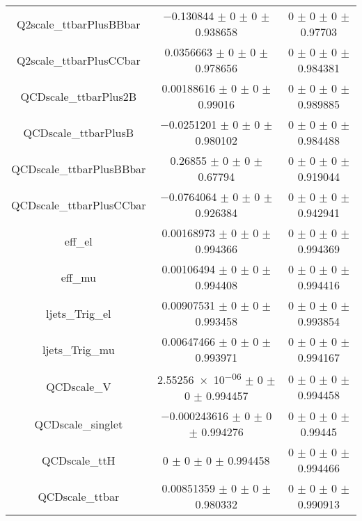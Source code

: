 \begin{table}
\begin{tabular}{ccc}
Q2scale\_ttbarPlusBBbar & \num{-0.130844} $\pm$ \num{0} $\pm$ \num{0} $\pm$ \num{0.938658} & \num{0} $\pm$ \num{0} $\pm$ \num{0} $\pm$ \num{0.97703}\\
Q2scale\_ttbarPlusCCbar & \num{0.0356663} $\pm$ \num{0} $\pm$ \num{0} $\pm$ \num{0.978656} & \num{0} $\pm$ \num{0} $\pm$ \num{0} $\pm$ \num{0.984381}\\
QCDscale\_ttbarPlus2B & \num{0.00188616} $\pm$ \num{0} $\pm$ \num{0} $\pm$ \num{0.99016} & \num{0} $\pm$ \num{0} $\pm$ \num{0} $\pm$ \num{0.989885}\\
QCDscale\_ttbarPlusB & \num{-0.0251201} $\pm$ \num{0} $\pm$ \num{0} $\pm$ \num{0.980102} & \num{0} $\pm$ \num{0} $\pm$ \num{0} $\pm$ \num{0.984488}\\
QCDscale\_ttbarPlusBBbar & \num{0.26855} $\pm$ \num{0} $\pm$ \num{0} $\pm$ \num{0.67794} & \num{0} $\pm$ \num{0} $\pm$ \num{0} $\pm$ \num{0.919044}\\
QCDscale\_ttbarPlusCCbar & \num{-0.0764064} $\pm$ \num{0} $\pm$ \num{0} $\pm$ \num{0.926384} & \num{0} $\pm$ \num{0} $\pm$ \num{0} $\pm$ \num{0.942941}\\
eff\_el & \num{0.00168973} $\pm$ \num{0} $\pm$ \num{0} $\pm$ \num{0.994366} & \num{0} $\pm$ \num{0} $\pm$ \num{0} $\pm$ \num{0.994369}\\
eff\_mu & \num{0.00106494} $\pm$ \num{0} $\pm$ \num{0} $\pm$ \num{0.994408} & \num{0} $\pm$ \num{0} $\pm$ \num{0} $\pm$ \num{0.994416}\\
ljets\_Trig\_el & \num{0.00907531} $\pm$ \num{0} $\pm$ \num{0} $\pm$ \num{0.993458} & \num{0} $\pm$ \num{0} $\pm$ \num{0} $\pm$ \num{0.993854}\\
ljets\_Trig\_mu & \num{0.00647466} $\pm$ \num{0} $\pm$ \num{0} $\pm$ \num{0.993971} & \num{0} $\pm$ \num{0} $\pm$ \num{0} $\pm$ \num{0.994167}\\
QCDscale\_V & \num{2.55256e-06} $\pm$ \num{0} $\pm$ \num{0} $\pm$ \num{0.994457} & \num{0} $\pm$ \num{0} $\pm$ \num{0} $\pm$ \num{0.994458}\\
QCDscale\_singlet & \num{-0.000243616} $\pm$ \num{0} $\pm$ \num{0} $\pm$ \num{0.994276} & \num{0} $\pm$ \num{0} $\pm$ \num{0} $\pm$ \num{0.99445}\\
QCDscale\_ttH & \num{0} $\pm$ \num{0} $\pm$ \num{0} $\pm$ \num{0.994458} & \num{0} $\pm$ \num{0} $\pm$ \num{0} $\pm$ \num{0.994466}\\
QCDscale\_ttbar & \num{0.00851359} $\pm$ \num{0} $\pm$ \num{0} $\pm$ \num{0.980332} & \num{0} $\pm$ \num{0} $\pm$ \num{0} $\pm$ \num{0.990913}\\

\end{tabular}
\end{table}
